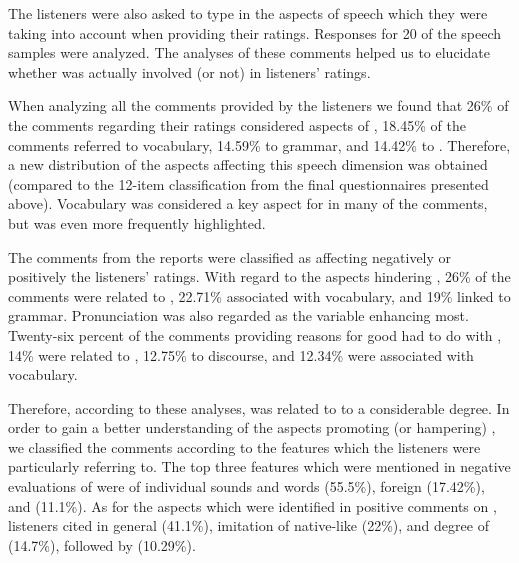 \documentclass[output=paper]{langsci/langscibook}
\begin{document}
The listeners were also asked to type in the aspects of speech which they were taking into account when providing their  ratings. Responses for 20 of the speech samples were analyzed. The analyses of these comments helped us to elucidate whether  was actually involved (or not) in listeners'  ratings. 

When analyzing all the comments provided by the listeners we found that 26\% of the comments regarding their  ratings considered aspects of , 18.45\% of the comments referred to vocabulary, 14.59\% to grammar, and 14.42\% to . Therefore, a new distribution of the aspects affecting this speech dimension was obtained (compared to the 12-item classification from the final questionnaires presented above). Vocabulary was considered a key aspect for  in many of the comments, but  was even more frequently highlighted. 

The comments from the reports were classified as affecting negatively or positively the listeners’ ratings. With regard to the aspects hindering , 26\% of the comments were related to , 22.71\% associated with vocabulary, and 19\% linked to grammar. Pronunciation was also regarded as the variable enhancing  most. Twenty-six percent of the comments providing reasons for good  had to do with , 14\% were related to , 12.75\% to discourse, and 12.34\% were associated with vocabulary. 

\largerpage
Therefore, according to these analyses,  was related to  to a considerable degree. In order to gain a better understanding of the  aspects promoting (or hampering) , we classified the comments according to the  features which the listeners were particularly referring to. The top three  features which were mentioned in negative evaluations of  were  of individual sounds and words (55.5\%), foreign  (17.42\%), and  (11.1\%). As for the  aspects which were identified in positive comments on , listeners cited  in general (41.1\%), imitation of native-like  (22\%), and degree of  (14.7\%), followed by  (10.29\%).
\end{document}

